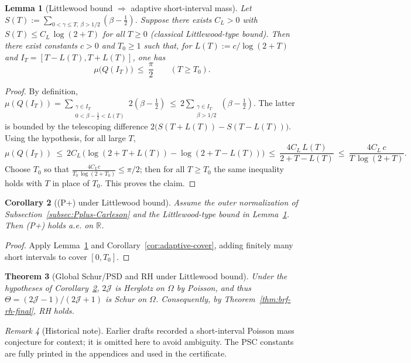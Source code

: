 \documentclass[11pt]{article}
\newtheorem{theorem}{Theorem}
\newtheorem{lemma}[theorem]{Lemma}
\newtheorem{corollary}[theorem]{Corollary}
\theoremstyle{definition}
\theoremstyle{remark}
\newtheorem{remark}[theorem]{Remark}
\newcommand{\R}{\mathbb{R}}
\begin{document}
\begin{lemma}[Littlewood bound \(\Rightarrow\) adaptive short-interval mass]\label{lem:littlewood-adaptive}
Let \(S(T):=\sum_{0<\gamma\le T,\ \beta>1/2}(\beta-\tfrac12)\). Suppose there exists \(C_L>0\) with \(S(T)\le C_L\,\log(2+T)\) for all \(T\ge 0\) (classical Littlewood-type bound). Then there exist constants \(c>0\) and \(T_0\ge 1\) such that, for \(L(T):=c/\log(2+T)\) and \(I_T=[T-L(T),T+L(T)]\), one has
\[\mu\big(Q(I_T)\big)\ \le\ \frac{\pi}{2}\qquad (T\ge T_0).\]
\end{lemma}
\begin{proof}
By definition, \(\mu(Q(I_T))=\sum_{\substack{\gamma\in I_T\\ 0<\beta-\tfrac12< L(T)}} 2(\beta-\tfrac12)\ \le\ 2\sum_{\substack{\gamma\in I_T\\ \beta>1/2}} (\beta-\tfrac12)\). The latter is bounded by the telescoping difference \(2\big(S(T+L(T)) - S(T-L(T))\big)\). Using the hypothesis, for all large \(T\),
\[
 \mu(Q(I_T))\ \le\ 2C_L\,\Big(\log(2+T+L(T)) - \log(2+T-L(T))\Big)
 \ \le\ \frac{4C_L\,L(T)}{2+T-L(T)}\ \le\ \frac{4C_L\,c}{T\,\log(2+T)}.
\]
Choose \(T_0\) so that \(\frac{4C_L c}{T_0\,\log(2+T_0)}\le \pi/2\); then for all \(T\ge T_0\) the same inequality holds with \(T\) in place of \(T_0\). This proves the claim.
\end{proof}
\begin{corollary}[(P+) under Littlewood bound]\label{cor:Pplus-Littlewood}
Assume the outer normalization of Subsection~\ref{subsec:Pplus-Carleson} and the Littlewood-type bound in Lemma~\ref{lem:littlewood-adaptive}. Then \emph{(P+)} holds a.e. on \(\R\).
\end{corollary}
\begin{proof}
Apply Lemma~\ref{lem:littlewood-adaptive} and Corollary~\ref{cor:adaptive-cover}, adding finitely many short intervals to cover \([0,T_0]\).
\end{proof}

\begin{theorem}[Global Schur/PSD and RH under Littlewood bound]\label{thm:global-RH-Littlewood}
Under the hypotheses of Corollary~\ref{cor:Pplus-Littlewood}, \(2\mathcal J\) is Herglotz on \(\Omega\) by Poisson, and thus \(\Theta=(2\mathcal J-1)/(2\mathcal J+1)\) is Schur on \(\Omega\). Consequently, by Theorem~\ref{thm:brf-rh-final}, RH holds.
\end{theorem}

\begin{remark}[Historical note]
Earlier drafts recorded a short-interval Poisson mass conjecture for context; it is omitted here to avoid ambiguity. The PSC constants are fully printed in the appendices and used in the certificate.
\end{remark}
\end{document}

